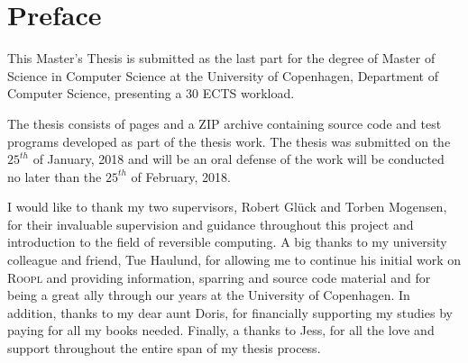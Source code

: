 \chapter*{Preface}

This Master's Thesis is submitted as the last part for the degree of Master of Science in Computer Science at the University of Copenhagen, Department of Computer Science, presenting a 30 ECTS workload.

The thesis consists of \pageref*{LastPage} pages and a ZIP archive containing source code and test programs developed as part of the thesis work. The thesis was submitted on the $25^{th}$ of January, 2018 and will be an oral defense of the work will be conducted no later than the $25^{th}$ of February, 2018.

I would like to thank my two supervisors, Robert Glück and Torben Mogensen, for their invaluable supervision and guidance throughout this project and introduction to the field of reversible computing. A big thanks to my university colleague and friend, Tue Haulund, for allowing me to continue his initial work on \textsc{Roopl} and providing information, sparring and source code material and for being a great ally through our years at the University of Copenhagen. In addition, thanks to my dear aunt Doris, for financially supporting my studies by paying for all my books needed. Finally, a thanks to Jess, for all the love and support throughout the entire span of my thesis process.
